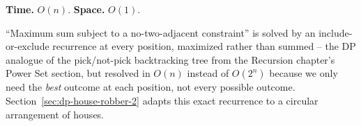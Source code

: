 \begin{complexitybox}
\textbf{Time.} $O(n)$.
\textbf{Space.} $O(1)$.
\end{complexitybox}

\begin{takeawaybox}
``Maximum sum subject to a no-two-adjacent constraint'' is solved by an
include-or-exclude recurrence at every position, maximized rather than
summed -- the DP analogue of the pick/not-pick backtracking tree from
the Recursion chapter's Power Set section, but resolved in $O(n)$ instead of
$O(2^n)$ because we only need the \emph{best} outcome at each position,
not every possible outcome. Section~\ref{sec:dp-house-robber-2} adapts
this exact recurrence to a circular arrangement of houses.
\end{takeawaybox}
